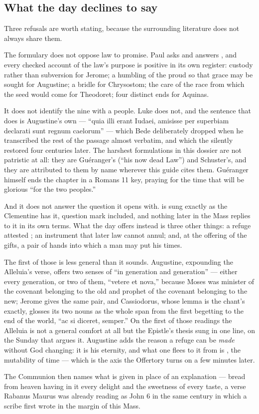 \subsection*{What the day declines to say}

Three refusals are worth stating, because the surrounding literature does not
always share them.

The formulary does not oppose law to promise. Paul asks  and answers , and every checked account of
the law's purpose is positive in its own register: custody rather than
subversion for Jerome; a humbling of the proud so that grace may be sought for
Augustine; a bridle for Chrysostom; the care of the race from which the seed
would come for Theodoret; four distinct ends for Aquinas.

It does not identify the nine with a people. Luke does not, and the sentence
that does is Augustine's own --- ``quia illi erant Iudaei, amisisse per
superbiam declarati sunt regnum caelorum'' --- which Bede deliberately dropped
when he transcribed the rest of the passage almost verbatim, and which the
 silently restored four centuries later. The harshest
formulations in this dossier are not patristic at all: they are Guéranger's
(``his now dead Law'') and Schuster's, and they are attributed to them by name
wherever this guide cites them. Guéranger himself ends the chapter in a Romans
11 key, praying for the time that will be glorious ``for the two peoples.''

And it does not answer the question it opens with.  is sung exactly as the Clementine has it, question mark
included, and nothing later in the Mass replies to it in its own terms. What
the day offers instead is three other things: a refuge attested ; an instrument that later law cannot annul; and, at
the offering of the gifts, a pair of hands into which a man may put his times.

The first of those is less general than it sounds. Augustine, expounding the
Alleluia's verse, offers two senses of ``in generation and generation'' ---
either every generation, or two of them, ``vetere et nova,'' because Moses was
minister of the covenant belonging to the old and prophet of the covenant
belonging to the new; Jerome gives the same pair, and Cassiodorus, whose lemma
is the chant's exactly, glosses its two nouns as the whole span from the first
begetting to the end of the world, ``ac si diceret, semper.'' On the first of
those readings the Alleluia is not a general comfort at all but the Epistle's
thesis sung in one line, on the Sunday that argues it. Augustine adds the
reason a refuge can be \emph{made} without God changing: it is his eternity,
and what one flees to it from is , the mutability
of time --- which is the axis the Offertory turns on a few minutes later.

The Communion then names what is given in place of an explanation --- bread
from heaven having in it every delight and the sweetness of every taste, a
verse Rabanus Maurus was already reading as John 6 in the same century in which
a scribe first wrote  in the margin of this Mass.
